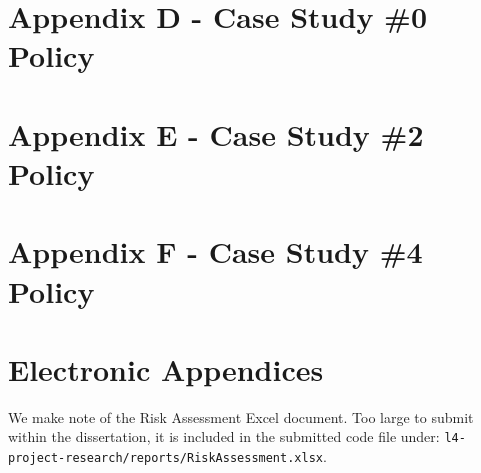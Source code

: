 \begin{appendices}
\begin{figure}
\end{figure}

\section{Appendix D - Case Study \#0 Policy}
\label{appendix:case_study_0_policy}



\section{Appendix E - Case Study \#2 Policy}
\label{appendix:case_study_2_policy}



\section{Appendix F - Case Study \#4 Policy}
\label{appendix:case_study_4_policy}



\section{Electronic Appendices}
\label{appendix:electronic_appendices}

We make note of the Risk Assessment Excel document. Too large to submit within the dissertation, it is included in the submitted code file under: \texttt{l4-project-research/reports/RiskAssessment.xlsx}.

\end{appendices}

